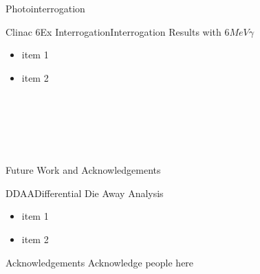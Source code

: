 \begin{col}{6}{12}
  \def\numheadings{2}
  \begin{cell}{6}{8}{Photointerrogation}{}
    \begin{col}{2}{8}
      \begin{cell}{2}{5}{Clinac 6Ex Interrogation}{Interrogation Results with $6 MeV \gamma$}
        \begin{itemize}
          \item item 1
          \item item 2
        \end{itemize}
      \end{cell} \\
      \vspace*{\fill}
      \begin{cell}{2}{3}{}{}
      \end{cell}
    \end{col}%
    \begin{col}{4}{8}
      \begin{cell}{4}{3}{}{}
      \end{cell} \\
      \vspace*{\fill}
      \begin{cell}{4}{5}{}{}
      \end{cell}
    \end{col}%
  \end{cell}
  \vspace*{\fill} \\
  \begin{cell}{6}{4}{Future Work and Acknowledgements}{}
    \begin{cell}{3}{4}{DDAA}{Differential Die Away Analysis}
      \begin{itemize}
        \item item 1
        \item item 2
      \end{itemize}
    \end{cell}%
    \hspace*{\fill}
    \begin{cell}{3}{4}{Acknowledgements}{}
      Acknowledge people here
    \end{cell}
  \end{cell}%
\end{col}%

